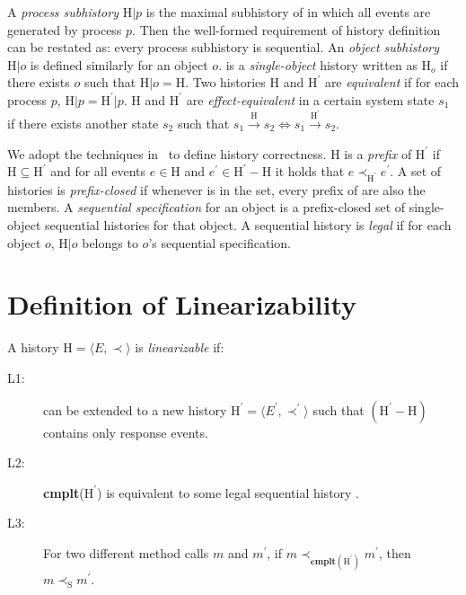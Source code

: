 \documentclass[a4paper,USenglish]{lipics-v2016}
\newcommand{\linb}{linearizable}
\newcommand{\cmplt}{\textbf{cmplt}}
\newcommand{\his}{\text{H}}
\newcommand{\shis}{\text{S}}
\newcommand{\evts}{\textit{E}}
\newcommand{\myvert}{\vert}
\begin{document}
A \textit{process subhistory} $\his \myvert p$ is the maximal subhistory of {\his} in which all events are generated by process $p$.
Then the well-formed requirement of history definition can be restated as: every process subhistory is sequential.
An \textit{object subhistory} $\his \myvert o$ is defined similarly for an object $o$.
{\his} is a \textit{single-object} history written as $\his_o$ if there exists $o$ such that $\his \myvert o = \his$.
Two histories $\his$ and $\his^\prime$ are \textit{equivalent}
if for each process $p$, $\his \myvert p = \his^\prime \myvert p$.
$\his$ and $\his^\prime$ are \textit{effect-equivalent} in a certain system state $s_1$
if there exists another state $s_2$ such that
$s_1 \stackrel{\his}{\longrightarrow} s_2 \iff s_1 \stackrel{\his^\prime}{\longrightarrow} s_2$.

We adopt the techniques in~\cite{Herlihy90} to define history correctness.
$\his$ is a \textit{prefix} of $\his^\prime$ if $\his \subseteq \his^\prime$
and for all events $e \in \his$ and $e^\prime \in \his^\prime - \his$ it holds that $e \prec_{\his^\prime} e^\prime$.
A set of histories is \textit{prefix-closed} if whenever {\his} is in the set, every prefix of {\his} are also the members. 
A \textit{sequential specification} for an object is a prefix-closed set of single-object sequential histories for that object.
A sequential history {\his} is \textit{legal} if for each object $o$, $\his \myvert o$ belongs to $o$'s sequential specification.

\section{Definition of Linearizability}\label{sec:def_lin}
\begin{definition}\label{def_lin}
	A history $\his = \langle \evts, \prec \rangle$ is \textit{\linb} if:
	\begin{description}
		\item[L1:]
		{\his} can be extended to a new history $\his^\prime = \langle \evts^\prime, \prec^\prime \rangle$ such that $(\his^\prime - \his)$ contains only response events.
		\item[L2:]
		\cmplt($\his^\prime$) is equivalent to some legal sequential history {\shis}.
		\item[L3:]
		For two different method calls $m$ and $m^\prime$, if $m \prec_{\cmplt(\his^\prime)} m^\prime$, then $m \prec_{\shis} m^\prime$.
	\end{description}
\end{definition}
\end{document}
